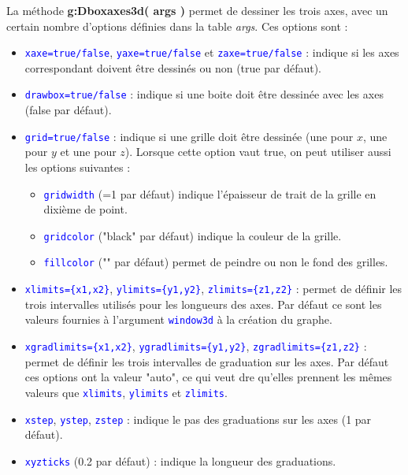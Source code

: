 La méthode \textbf{g:Dboxaxes3d( args )} permet de dessiner les trois axes, avec un certain nombre d'options définies dans la table \emph{args}. Ces options sont :
\def\opt#1{\textcolor{blue}{\texttt{#1}}}%
\begin{itemize}
    \item \opt{xaxe=true/false}, \opt{yaxe=true/false} et \opt{zaxe=true/false} : indique si les axes correspondant doivent être dessinés ou non (true par défaut).

    \item \opt{drawbox=true/false} : indique si une boite doit être dessinée avec les axes (false par défaut).

    \item \opt{grid=true/false} : indique si une grille doit être dessinée (une pour $x$, une pour $y$ et une pour $z$). Lorsque cette option vaut true, on peut utiliser aussi les options suivantes :
        \begin{itemize}
            \item \opt{gridwidth} (=1 par défaut) indique l'épaisseur de trait de la grille en dixième de point.
            \item \opt{gridcolor} ("black" par défaut) indique la couleur de la grille.
            \item \opt{fillcolor} ("" par défaut) permet de peindre ou non le fond des grilles.
        \end{itemize}
    
    \item \opt{xlimits=\{x1,x2\}}, \opt{ylimits=\{y1,y2\}}, \opt{zlimits=\{z1,z2\}} : permet de définir les trois intervalles utilisés pour les longueurs des axes. Par défaut ce sont les valeurs fournies à l'argument \opt{window3d} à la création du graphe.

    \item \opt{xgradlimits=\{x1,x2\}}, \opt{ygradlimits=\{y1,y2\}}, \opt{zgradlimits=\{z1,z2\}} : permet de définir les trois intervalles de graduation sur les axes. Par défaut ces options ont la valeur "auto", ce qui veut dre qu'elles prennent les mêmes valeurs que \opt{xlimits}, \opt{ylimits} et \opt{zlimits}.

    \item \opt{xstep}, \opt{ystep}, \opt{zstep} : indique le pas des graduations sur les axes (1 par défaut).

    \item \opt{xyzticks} (0.2 par défaut) : indique la longueur des graduations.


\end{itemize}

